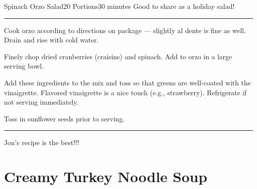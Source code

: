\documentclass[openany]{book}
\begin{document}
\begin{recipe}{Spinach Orzo Salad}{20 Portions}{30 minutes}
\freeform Good to share as a holiday salad!
\freeform\rule{\textwidth}{0.05pt}

Cook orzo according to directions on package --- slightly al dente is fine as well. Drain and rise with cold water.


Finely chop dried cranberries (craisins) and spinach. Add to orzo in a large serving bowl.


Add these ingredients to the mix and toss so that greens are well-coated with the vinaigrette. Flavored vinaigrette is a nice touch (e.g., strawberry). Refrigerate if not serving immediately.


Toss in sunflower seeds prior to serving.

\freeform\rule{\textwidth}{0.05pt}

\freeform Jon's recipe is the best!!!

\end{recipe}

\chapter{Creamy Turkey Noodle Soup}\label{creamy-turkey-noodle-soup}
\end{document}

